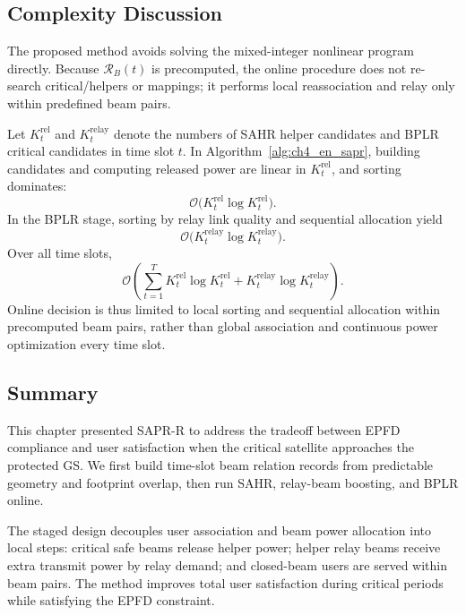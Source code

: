 \subsection{Complexity Discussion}

The proposed method avoids solving the mixed-integer nonlinear program directly. Because $\mathcal{R}_B(t)$ is precomputed, the online procedure does not re-search critical/helpers or mappings; it performs local reassociation and relay only within predefined beam pairs.

Let $K_t^{\mathrm{rel}}$ and $K_t^{\mathrm{relay}}$ denote the numbers of SAHR helper candidates and BPLR critical candidates in time slot $t$. In Algorithm~\ref{alg:ch4_en_sapr}, building candidates and computing released power are linear in $K_t^{\mathrm{rel}}$, and sorting dominates:
\begin{equation*}
\mathcal{O}\!\bigl(K_t^{\mathrm{rel}}\log K_t^{\mathrm{rel}}\bigr).
\end{equation*}
In the BPLR stage, sorting by relay link quality and sequential allocation yield
\begin{equation*}
\mathcal{O}\!\bigl(K_t^{\mathrm{relay}}\log K_t^{\mathrm{relay}}\bigr).
\end{equation*}
Over all time slots,
\begin{equation*}
\mathcal{O}\!\left(
\sum_{t=1}^{T}
K_t^{\mathrm{rel}}\log K_t^{\mathrm{rel}}
+
K_t^{\mathrm{relay}}\log K_t^{\mathrm{relay}}
\right).
\end{equation*}
Online decision is thus limited to local sorting and sequential allocation within precomputed beam pairs, rather than global association and continuous power optimization every time slot.

\subsection{Summary}

This chapter presented SAPR-R to address the tradeoff between EPFD compliance and user satisfaction when the critical satellite approaches the protected GS. We first build time-slot beam relation records from predictable geometry and footprint overlap, then run SAHR, relay-beam boosting, and BPLR online.

The staged design decouples user association and beam power allocation into local steps: critical safe beams release helper power; helper relay beams receive extra transmit power by relay demand; and closed-beam users are served within beam pairs. The method improves total user satisfaction during critical periods while satisfying the EPFD constraint.
